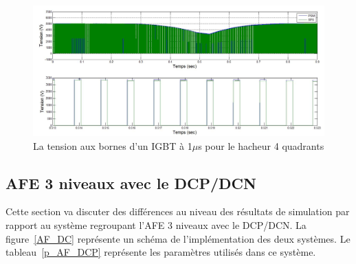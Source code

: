 \documentclass[11pt,letterpaper,final]{report}
\begin{document}
\begin{figure}[htb]
\centering
\includegraphics[scale=0.5]{Fig/Hach_AFE/1u/IGBT_ten_hach.jpg}
\caption{La tension aux bornes d'un IGBT à 1$\mu$s pour le hacheur 4 quadrants}
\label{AF_HA_HAV1}
\end{figure}



\clearpage
\subsection{AFE 3 niveaux avec le DCP/DCN}
Cette section va discuter des différences au niveau des résultats de simulation par rapport au système regroupant l'AFE 3 niveaux avec le DCP/DCN. La figure~\ref{AF_DC} représente un schéma de l'implémentation des deux systèmes. Le tableau~\ref{p_AF_DCP} représente les paramètres utilisés dans ce système.
\end{document}
